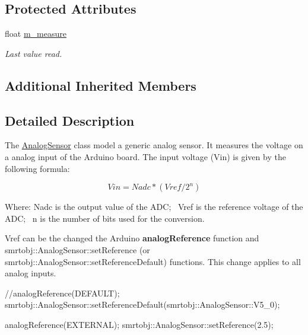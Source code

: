 \subsection*{Protected Attributes}
\begin{DoxyCompactItemize}
\item 
\hypertarget{classsmrtobj_1_1io_1_1_analog_sensor_a6be01825a9813d8b4b28d64d99a908f2}{}float \hyperlink{classsmrtobj_1_1io_1_1_analog_sensor_a6be01825a9813d8b4b28d64d99a908f2}{m\+\_\+measure}\label{classsmrtobj_1_1io_1_1_analog_sensor_a6be01825a9813d8b4b28d64d99a908f2}

\begin{DoxyCompactList}\small\item\em Last value read. \end{DoxyCompactList}\end{DoxyCompactItemize}
\subsection*{Additional Inherited Members}


\subsection{Detailed Description}
The \hyperlink{classsmrtobj_1_1io_1_1_analog_sensor}{Analog\+Sensor} class model a generic analog sensor. It measures the voltage on a analog input of the Arduino board. The input voltage (Vin) is given by the following formula\+:

\[Vin= Nadc*(Vref/2^n)\]

Where\+: {\ttfamily Nadc} is the output value of the A\+D\+C;~\newline
{\ttfamily Vref} is the reference voltage of the A\+D\+C;~\newline
{\ttfamily n} is the number of bits used for the conversion.

Vref can be the changed the Arduino {\bfseries analog\+Reference} function and smrtobj\+::\+Analog\+Sensor\+::set\+Reference (or smrtobj\+::\+Analog\+Sensor\+::set\+Reference\+Default) functions. This change applies to all analog inputs.


\begin{DoxyCode}
\textcolor{comment}{//analogReference(DEFAULT);}
smrtobj::AnalogSensor::setReferenceDefault(smrtobj::AnalogSensor::V5\_0);

analogReference(EXTERNAL);
smrtobj::AnalogSensor::setReference(2.5);
\end{DoxyCode}
 

